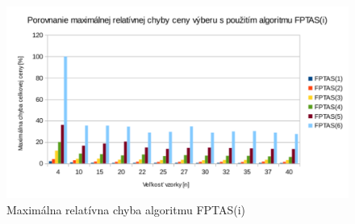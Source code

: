 \documentclass[slovak]{article}
\begin{document}
\begin{figure}\centering
	\includegraphics[scale=0.8]{./chyba2.pdf}
	\caption{Maximálna relatívna chyba algoritmu FPTAS(i)}
	\label{gr:graf3}
\end{figure}
\end{document}
